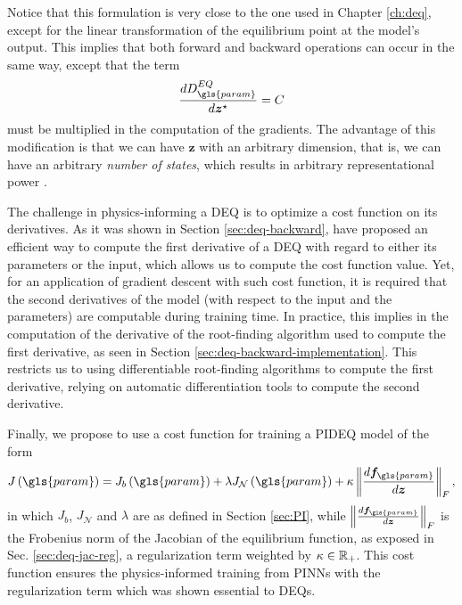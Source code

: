 Notice that this formulation is very close to the one used in Chapter \ref{ch:deq}, except for the linear transformation of the equilibrium point at the model's output.
This implies that both forward and backward operations can occur in the same way, except that the term  \[
    \frac{d D^{EQ}_{\gls{param}}}{d \bm{z}^{\star}} = C
\] must be multiplied in the computation of the gradients.
The advantage of this modification is that we can have $\bm{z}$ with an arbitrary dimension, that is, we can have an arbitrary \emph{number of states}, which results in arbitrary representational power \cite{Ghaoui2019}.

The challenge in physics-informing a \gls{DEQ} is to optimize a cost function on its derivatives.
As it was shown in Section \ref{sec:deq-backward}, \textcite{Bai2019} have proposed an efficient way to compute the first derivative of a \gls{DEQ} with regard to either its parameters or the input, which allows us to compute the cost function value.
Yet, for an application of gradient descent with such cost function, it is required that the second derivatives of the model (with respect to the input and the parameters) are computable during training time.
In practice, this implies in the computation of the derivative of the root-finding algorithm used to compute the first derivative, as seen in Section \ref{sec:deq-backward-implementation}.\footnotemark
{}
This restricts us to using differentiable root-finding algorithms to compute the first derivative, relying on automatic differentiation tools to compute the second derivative.

Finally, we propose to use a cost function for training a \gls{PIDEQ} model of the form \[
    J\left( \gls{param} \right) = J_b\left( \gls{param} \right) + \lambda J_{\mathcal{N}}\left( \gls{param} \right) + \kappa \left\lVert \frac{d \bm{f}_{\gls{param}}}{d \bm{z}}\right\rVert_F
,\] 
in which $J_b$, $J_{\mathcal{N}}$ and $\lambda$ are as defined in Section \ref{sec:PI}, while $\left\lVert \frac{d \bm{f}_{\gls{param}}}{d \bm{z}}\right\rVert_F$ is the Frobenius norm of the Jacobian of the equilibrium function, as exposed in Sec. \ref{sec:deq-jac-reg}, a regularization term weighted by $\kappa \in \mathbb{R}_+$.
This cost function ensures the physics-informed training from \gls{PINN}s with the regularization term which was shown essential to \gls{DEQ}s.

